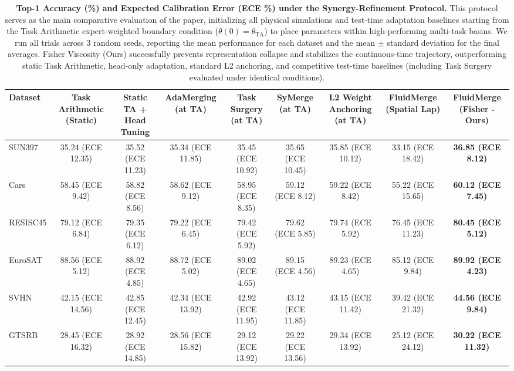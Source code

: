 \begin{table}[t]
\caption{\textbf{Top-1 Accuracy (\%) and Expected Calibration Error (ECE \%) under the Synergy-Refinement Protocol.} This protocol serves as the main comparative evaluation of the paper, initializing all physical simulations and test-time adaptation baselines starting from the Task Arithmetic expert-weighted boundary condition ($\theta(0) = \theta_{\text{TA}}$) to place parameters within high-performing multi-task basins. We run all trials across 3 random seeds, reporting the mean performance for each dataset and the mean $\pm$ standard deviation for the final averages. Fisher Viscosity (Ours) successfully prevents representation collapse and stabilizes the continuous-time trajectory, outperforming static Task Arithmetic, head-only adaptation, standard L2 anchoring, and competitive test-time baselines (including Task Surgery evaluated under identical conditions).}
\label{tab:synergy_results}
\vskip 0.15in
\begin{center}
\begin{small}
\begin{sc}
\begin{tabular}{lcccccccc}
\toprule
Dataset & Task Arithmetic (Static) & Static TA + Head Tuning & AdaMerging (at TA) & Task Surgery (at TA) & SyMerge (at TA) & L2 Weight Anchoring (at TA) & FluidMerge (Spatial Lap) & FluidMerge (Fisher - Ours) \\
\midrule
SUN397   & 35.24 (ECE 12.35) & 35.52 (ECE 11.23) & 35.34 (ECE 11.85) & 35.45 (ECE 10.92) & 35.65 (ECE 10.45) & 35.85 (ECE 10.12) & 33.15 (ECE 18.42) & \textbf{36.85 (ECE 8.12)} \\
Cars     & 58.45 (ECE 9.42)  & 58.82 (ECE 8.56)  & 58.62 (ECE 9.12)  & 58.95 (ECE 8.35)  & 59.12 (ECE 8.12)  & 59.22 (ECE 8.42)  & 55.22 (ECE 15.65) & \textbf{60.12 (ECE 7.45)} \\
RESISC45 & 79.12 (ECE 6.84)  & 79.35 (ECE 6.12)  & 79.22 (ECE 6.45)  & 79.42 (ECE 5.92)  & 79.62 (ECE 5.85)  & 79.74 (ECE 5.92)  & 76.45 (ECE 11.23) & \textbf{80.45 (ECE 5.12)} \\
EuroSAT  & 88.56 (ECE 5.12)  & 88.92 (ECE 4.85)  & 88.72 (ECE 5.02)  & 89.02 (ECE 4.65)  & 89.15 (ECE 4.56)  & 89.23 (ECE 4.65)  & 85.12 (ECE 9.84)  & \textbf{89.92 (ECE 4.23)} \\
SVHN     & 42.15 (ECE 14.56) & 42.85 (ECE 12.45) & 42.34 (ECE 13.92) & 42.92 (ECE 11.95) & 43.12 (ECE 11.85) & 43.15 (ECE 11.42) & 39.42 (ECE 21.32) & \textbf{44.56 (ECE 9.84)} \\
GTSRB    & 28.45 (ECE 16.32) & 28.92 (ECE 14.85) & 28.56 (ECE 15.82) & 29.12 (ECE 13.92) & 29.22 (ECE 13.56) & 29.34 (ECE 13.92) & 25.12 (ECE 24.12) & \textbf{30.22 (ECE 11.32)} \\

\end{tabular}
\end{sc}
\end{small}
\end{center}
\end{table}
